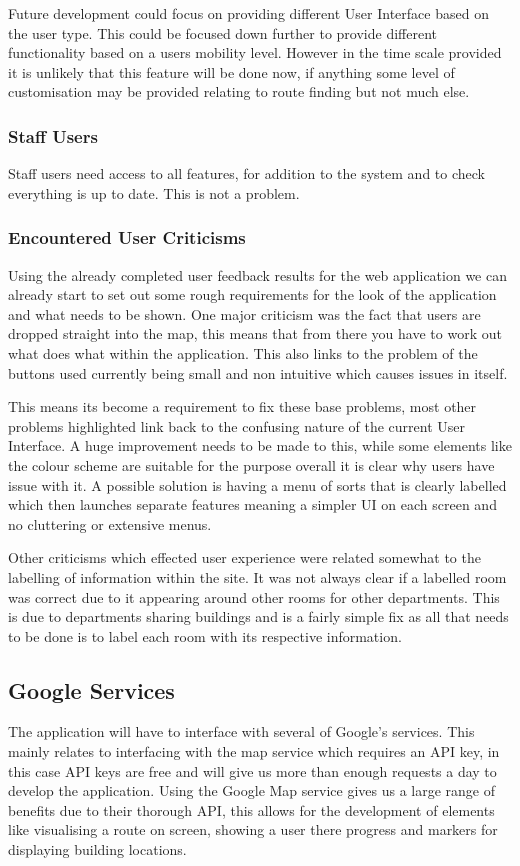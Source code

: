 Future development could focus on providing different User Interface based on the user type. This could be focused down further to provide different functionality based on a users mobility level. However in the time scale provided it is unlikely that this feature will be done now, if anything some level of customisation may be provided relating to route finding but not much else.
\subsubsection{Staff Users}
Staff users need access to all features, for addition to the system and to check everything is up to date. This is not a problem.
\subsubsection{Encountered User Criticisms}
Using the already completed user feedback results for the web application we can already start to set out some rough requirements for the look of the application and what needs to be shown. One major criticism was the fact that users are dropped straight into the map, this means that from there you have to work out what does what within the application. This also links to the problem of the buttons used currently being small and non intuitive which causes issues in itself.

This means its become a requirement to fix these base problems, most other problems highlighted link back to the confusing nature of the current User Interface. A huge improvement needs to be made to this, while some elements like the colour scheme are suitable for the purpose overall it is clear why users have issue with it. A possible solution is having a menu of sorts that is clearly labelled which then launches separate features meaning a simpler UI on each screen and no cluttering or extensive menus. 

Other criticisms which effected user experience were related somewhat to the labelling of information within the site. It was not always clear if a labelled room was correct due to it appearing around other rooms for other departments. This is due to departments sharing buildings and is a fairly simple fix as all that needs to be done is to label each room with its respective information. 
\subsection{Google Services}
The application will have to interface with several of Google's services. This mainly relates to interfacing with the map service which requires an API key, in this case API keys are free and will give us more than enough requests a day to develop the application. Using the Google Map service gives us a large range of benefits due to their thorough API, this allows for the development of elements like visualising a route on screen, showing a user there progress and markers for displaying building locations. 

